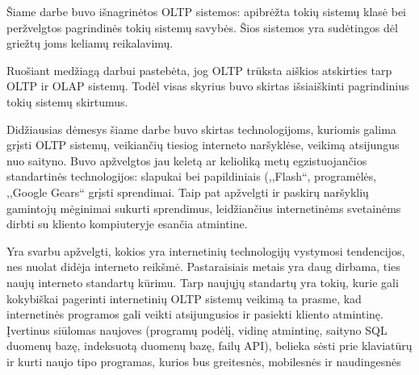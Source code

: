 \documentclass[12pt,a4paper,titlepage]{article}
\begin{document}
Šiame darbe buvo išnagrinėtos OLTP sistemos: apibrėžta tokių sistemų klasė bei peržvelgtos pagrindinės tokių sistemų savybės. Šios sistemos yra sudėtingos dėl griežtų joms keliamų reikalavimų.

Ruošiant medžiagą darbui pastebėta, jog OLTP trūksta aiškios atskirties tarp OLTP ir OLAP sistemų. Todėl visas skyrius buvo skirtas išsiaiškinti pagrindinius tokių sistemų skirtumus.

Didžiausias dėmesys šiame darbe buvo skirtas technologijoms, kuriomis galima grįsti OLTP sistemų, veikiančių tiesiog interneto naršyklėse, veikimą atsijungus nuo saityno. Buvo apžvelgtos jau keletą ar kelioliką metų egzistuojančios standartinės technologijos: slapukai bei papildiniais (,,Flash``, programėlės, ,,Google Gears`` grįsti sprendimai. Taip pat apžvelgti ir paskirų naršyklių gamintojų mėginimai sukurti sprendimus, leidžiančius internetinėms svetainėms dirbti su kliento kompiuteryje esančia atmintine.

Yra svarbu apžvelgti, kokios yra internetinių technologijų vystymosi tendencijos, nes nuolat didėja interneto reikšmė. Pastaraisiais metais yra daug dirbama, ties naujų interneto standartų kūrimu. Tarp naujųjų standartų yra tokių, kurie gali kokybiškai pagerinti internetinių OLTP sistemų veikimą ta prasme, kad internetinės programos gali veikti atsijungusios ir pasiekti kliento atmintinę. Įvertinus siūlomas naujoves (programų podėlį, vidinę atmintinę, saityno SQL duomenų bazę, indeksuotą duomenų bazę, failų API), belieka sėsti prie klaviatūrų ir kurti naujo tipo programas, kurios bus greitesnės, mobilesnės ir naudingesnės

\end{document}
